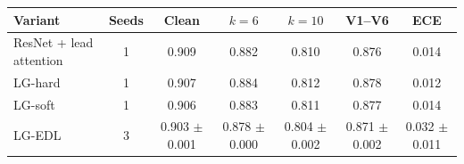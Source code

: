 \begin{tabular}{@{}lcccccc@{}}
\toprule
Variant & Seeds & Clean & $k{=}6$ & $k{=}10$ & V1--V6 & ECE \\
\midrule
ResNet + lead attention & 1 & 0.909 & 0.882 & 0.810 & 0.876 & 0.014 \\
LG-hard & 1 & 0.907 & 0.884 & 0.812 & 0.878 & 0.012 \\
LG-soft & 1 & 0.906 & 0.883 & 0.811 & 0.877 & 0.014 \\
LG-EDL & 3 & 0.903 $\pm$ 0.001 & 0.878 $\pm$ 0.000 & 0.804 $\pm$ 0.002 & 0.871 $\pm$ 0.002 & 0.032 $\pm$ 0.011 \\
\bottomrule
\end{tabular}
